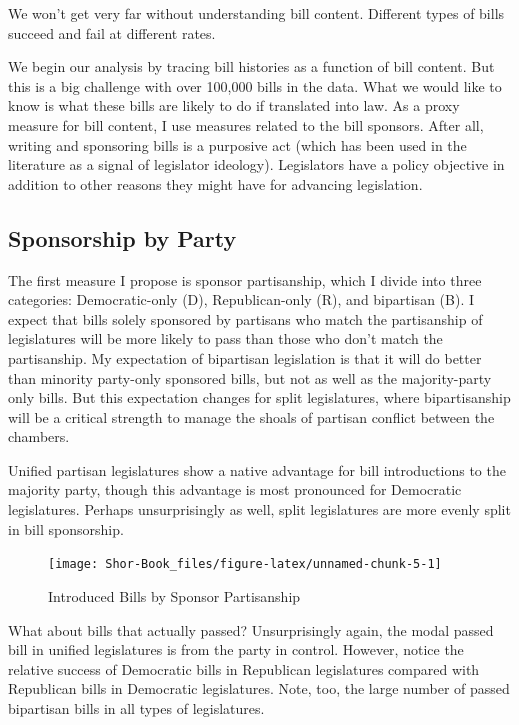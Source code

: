 \documentclass[
  oneside]{book}
\begin{document}
We won't get very far without understanding bill content. Different types of bills succeed and fail at different rates.

We begin our analysis by tracing bill histories as a function of bill content. But this is a big challenge with over 100,000 bills in the data. What we would like to know is what these bills are likely to do if translated into law. As a proxy measure for bill content, I use measures related to the bill sponsors. After all, writing and sponsoring bills is a purposive act (which has been used in the literature as a signal of legislator ideology). Legislators have a policy objective in addition to other reasons they might have for advancing legislation.

\hypertarget{sponsorship-by-party}{%
\subsection{Sponsorship by Party}\label{sponsorship-by-party}}

The first measure I propose is sponsor partisanship, which I divide into three categories: Democratic-only (D), Republican-only (R), and bipartisan (B). I expect that bills solely sponsored by partisans who match the partisanship of legislatures will be more likely to pass than those who don't match the partisanship. My expectation of bipartisan legislation is that it will do better than minority party-only sponsored bills, but not as well as the majority-party only bills. But this expectation changes for split legislatures, where bipartisanship will be a critical strength to manage the shoals of partisan conflict between the chambers.

Unified partisan legislatures show a native advantage for bill introductions to the majority party, though this advantage is most pronounced for Democratic legislatures. Perhaps unsurprisingly as well, split legislatures are more evenly split in bill sponsorship.

\begin{figure}
\texttt{[image: Shor-Book\_files/figure-latex/unnamed-chunk-5-1]} \caption{Introduced Bills by Sponsor Partisanship}\label{fig:unnamed-chunk-5}
\end{figure}

What about bills that actually passed? Unsurprisingly again, the modal passed bill in unified legislatures is from the party in control. However, notice the relative success of Democratic bills in Republican legislatures compared with Republican bills in Democratic legislatures. Note, too, the large number of passed bipartisan bills in all types of legislatures.
\end{document}
